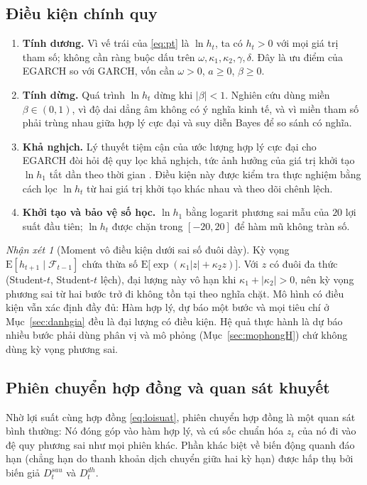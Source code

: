 \documentclass[12pt,a4paper]{article}
\theoremstyle{definition}
\theoremstyle{remark}
\newtheorem{nhanxet}{Nhận xét}[section]
\newcommand{\E}{\mathrm{E}}
\newcommand{\Fcal}{\mathcal{F}}
\begin{document}
\subsection{Điều kiện chính quy}

\begin{enumerate}
\item \textbf{Tính dương.} Vì vế trái của \eqref{eq:pt} là $\ln h_t$, ta có $h_t>0$ với mọi giá trị tham số; không cần ràng buộc dấu trên $\omega,\kappa_1,\kappa_2,\gamma,\delta$. Đây là ưu điểm của EGARCH so với GARCH, vốn cần $\omega>0$, $a\ge0$, $\beta\ge0$.
\item \textbf{Tính dừng.} Quá trình $\ln h_t$ dừng khi $|\beta|<1$. Nghiên cứu dùng miền $\beta\in(0,1)$, vì độ dai dẳng âm không có ý nghĩa kinh tế, và vì miền tham số phải trùng nhau giữa hợp lý cực đại và suy diễn Bayes để so sánh có nghĩa.
\item \textbf{Khả nghịch.} Lý thuyết tiệm cận của ước lượng hợp lý cực đại cho EGARCH đòi hỏi đệ quy lọc khả nghịch, tức ảnh hưởng của giá trị khởi tạo $\ln h_1$ tắt dần theo thời gian \cite{straumann2006}. Điều kiện này được kiểm tra thực nghiệm bằng cách lọc $\ln h_t$ từ hai giá trị khởi tạo khác nhau và theo dõi chênh lệch.
\item \textbf{Khởi tạo và bảo vệ số học.} $\ln h_1$ bằng logarit phương sai mẫu của $20$ lợi suất đầu tiên; $\ln h_t$ được chặn trong $[-20,20]$ để hàm mũ không tràn số.
\end{enumerate}

\begin{nhanxet}[Moment vô điều kiện dưới sai số đuôi dày]
Kỳ vọng $\E[h_{t+1}\mid\Fcal_{t-1}]$ chứa thừa số $\E\big[\exp(\kappa_1|z|+\kappa_2 z)\big]$. Với $z$ có đuôi đa thức (Student-$t$, Student-$t$ lệch), đại lượng này vô hạn khi $\kappa_1+|\kappa_2|>0$, nên kỳ vọng phương sai từ hai bước trở đi không tồn tại theo nghĩa chặt. Mô hình có điều kiện vẫn xác định đầy đủ: Hàm hợp lý, dự báo một bước và mọi tiêu chí ở Mục~\ref{sec:danhgia} đều là đại lượng có điều kiện. Hệ quả thực hành là dự báo nhiều bước phải dùng phân vị và mô phỏng (Mục~\ref{sec:mophongH}) chứ không dùng kỳ vọng phương sai.
\end{nhanxet}

\subsection{Phiên chuyển hợp đồng và quan sát khuyết}\label{sec:khuyet}

Nhờ lợi suất cùng hợp đồng \eqref{eq:loisuat}, phiên chuyển hợp đồng là một quan sát bình thường: Nó đóng góp vào hàm hợp lý, và cú sốc chuẩn hóa $z_t$ của nó đi vào đệ quy phương sai như mọi phiên khác. Phần khác biệt về biến động quanh đáo hạn (chẳng hạn do thanh khoản dịch chuyển giữa hai kỳ hạn) được hấp thụ bởi biến giả $D^{sau}_t$ và $D^{dh}_t$.
\end{document}
